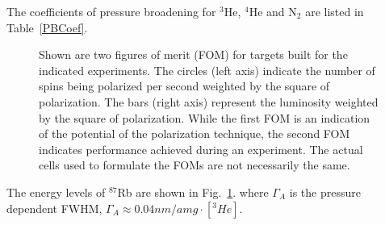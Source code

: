 \documentclass[pdftex,letterpaper,12pt]{report}
\begin{document}
The coefficients of pressure broadening for $^{3}$He, $^{4}$He and N$_{2}$ are listed in Table~\ref{PBCoef}.

\begin{figure}[t!]
	\centering
	\caption{{Shown are two figures of merit (FOM) for targets built for the indicated experiments.  The circles (left axis) indicate the number of spins being polarized per second weighted by the square of polarization.  The bars (right axis) represent the luminosity weighted by the square of polarization.  While the first FOM is an indication of the potential of the polarization technique, the second FOM indicates performance achieved during an experiment.  The actual cells used to formulate the FOMs are not necessarily the same.}}
	\label{fig:foms}
\end{figure}

The energy levels of $^{87}$Rb are shown in Fig.~\ref{fig:foms}.
where $\Gamma_{A}$ is the pressure dependent FWHM, $\Gamma_{A}\approx 0.04nm/amg \cdot [^{3}He]$.


\end{document}
